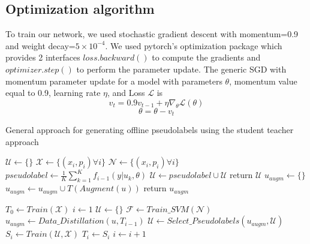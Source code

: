 \documentclass{article}
\begin{document}
\subsection{Optimization algorithm}
To train our network, we used stochastic gradient descent with momentum=0.9 and weight decay=$5\times10^{-4}$. We used pytorch's optimization package which provides 2 interfaces $loss.backward()$ to compute the gradients and $optimizer.step()$ to perform the parameter update. The generic SGD with momentum parameter update for a model with parameters $\theta$, momentum value equal to 0.9, learning rate $\eta$,  and Loss $\mathcal{L}$ is
$$ 
 v_{t} = 0.9 v_{t-1} + \eta \nabla_{\theta} \mathcal{L}(\theta) 
$$
$$
\theta = \theta - v_{t}
$$
\begin{algorithm}
    \caption{General approach for generating offline pseudolabels using the student teacher approach}\label{gen}
\begin{algorithmic}[1]
\State $\mathcal{U} \gets \{\} $ 
\State $\mathcal{X} \gets \{(x_{i},p_{i}) \forall i \} $ 
\State $\mathcal{N} \gets \{(x_{i},p_{i}) \forall i \} $ 
\State $pseudolabel \gets \frac{1}{K} \sum_{k=1}^{K} f_{i-1}(y | u_{k}, \theta)$
  
    \State $\mathcal{U} \gets pseudolabel \cup \mathcal{U}$
\EndIf
\State return $\mathcal{U}$
\EndFunction
{}
\State $u_{augm} \gets \{ \}$
 
    \State $u_{augm} \gets u_{augm} \cup T(Augment(u))$
\EndFor
\State return $u_{augm}$ 
\EndFunction

    \State $T_{0} \gets Train(\mathcal{X})$  
    \State $i \gets 1$ 
\State $\mathcal{U}\gets \{ \}$
\State $\mathcal{F} \gets Train\_SVM(\mathcal{N})$ 
 
    \State $u_{augm} \gets Data\_Distillation(u, T_{i-1})$
    \State $\mathcal{U} \gets Select\_Pseudolabels(u_{augm}, \mathcal{U})$
\EndFor
\State $S_{i} \gets Train(\mathcal{U}, \mathcal{X})$ 
\State $T_{i} \gets S_{i}$ 
\State $i \gets i+1$
\EndWhile
\EndProcedure
\end{algorithmic}
\end{algorithm}
\end{document}
